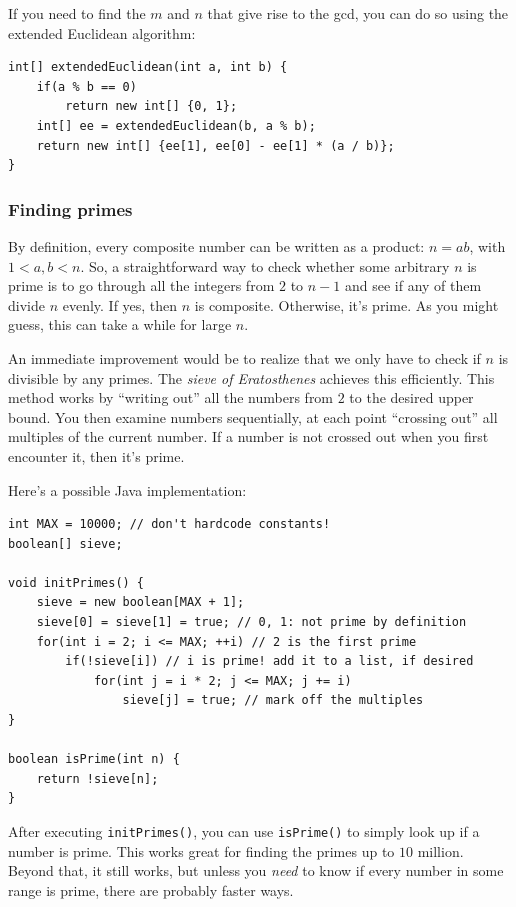 \documentclass[a4paper,12pt]{article}
\begin{document}
If you need to find the $m$ and $n$ that give rise to the gcd, you can do so using the extended Euclidean algorithm:
\begin{lstlisting}
int[] extendedEuclidean(int a, int b) {
	if(a % b == 0)
		return new int[] {0, 1};
	int[] ee = extendedEuclidean(b, a % b);
	return new int[] {ee[1], ee[0] - ee[1] * (a / b)};
}
\end{lstlisting}

\subsubsection{Finding primes}

By definition, every composite number can be written as a product: $n=ab$, with $1 < a,b < n$. So, a straightforward way to check whether some arbitrary $n$ is prime is to go through all the integers from $2$ to $n-1$ and see if any of them divide $n$ evenly. If yes, then $n$ is composite. Otherwise, it's prime. As you might guess, this can take a while for large $n$.

An immediate improvement would be to realize that we only have to check if $n$ is divisible by any primes. The {\em sieve of Eratosthenes} achieves this efficiently. This method works by ``writing out'' all the numbers from $2$ to the desired upper bound. You then examine numbers sequentially, at each point ``crossing out'' all multiples of the current number. If a number is not crossed out when you first encounter it, then it's prime. 

Here's a possible Java implementation:

\begin{lstlisting}
int MAX = 10000; // don't hardcode constants!
boolean[] sieve;

void initPrimes() {
	sieve = new boolean[MAX + 1];
	sieve[0] = sieve[1] = true; // 0, 1: not prime by definition
	for(int i = 2; i <= MAX; ++i) // 2 is the first prime
		if(!sieve[i]) // i is prime! add it to a list, if desired
			for(int j = i * 2; j <= MAX; j += i)
				sieve[j] = true; // mark off the multiples
}

boolean isPrime(int n) {
	return !sieve[n];
}
\end{lstlisting}

\noindent After executing \verb/initPrimes()/, you can use \verb/isPrime()/ to simply look up if a number is prime. This works great for finding the primes up to $10$ million. Beyond that, it still works, but unless you {\em need} to know if every number in some range is prime, there are probably faster ways.
\end{document}
